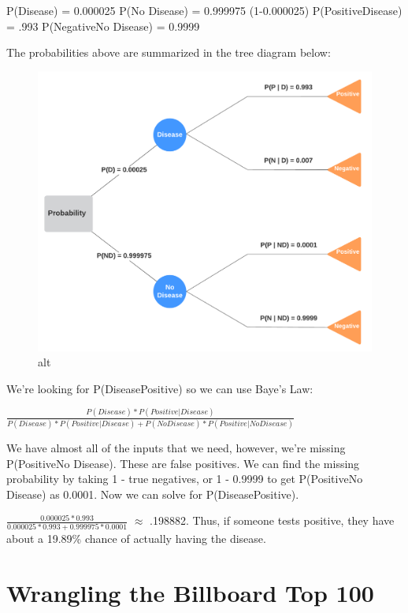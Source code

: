 \documentclass[
]{article}
\begin{document}
P(Disease) = 0.000025 P(No Disease) = 0.999975 (1-0.000025)
P(Positive\textbar Disease) = .993 P(Negative\textbar No Disease) =
0.9999

The probabilities above are summarized in the tree diagram below:

\begin{figure}
\centering
\includegraphics{tree.png}
\caption{alt}
\end{figure}

We're looking for P(Disease\textbar Positive) so we can use Baye's Law:

\(\frac{P(Disease)*P(Positive|Disease)}{P(Disease)*P(Positive|Disease)+P(No Disease)*P(Positive|No Disease)}\)

We have almost all of the inputs that we need, however, we're missing
P(Positive\textbar No Disease). These are false positives. We can find
the missing probability by taking 1 - true negatives, or 1 - 0.9999 to
get P(Positive\textbar No Disease) as 0.0001. Now we can solve for
P(Disease\textbar Positive).

\(\frac{0.000025*0.993}{0.000025*0.993+0.999975*0.0001}\) \(\approx\)
.198882. Thus, if someone tests positive, they have about a 19.89\%
chance of actually having the disease.

\hypertarget{wrangling-the-billboard-top-100}{%
\section{Wrangling the Billboard Top
100}\label{wrangling-the-billboard-top-100}}
\end{document}

